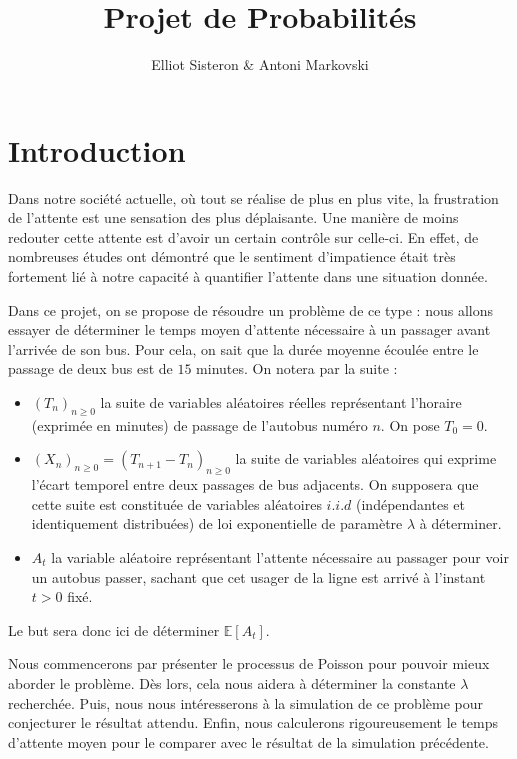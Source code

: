 \documentclass[a4paper, titlepage]{livret} %
\title{Projet de Probabilités} %
\author{Elliot Sisteron & Antoni Markovski} %
\begin{document}

	
	\chapter*{Introduction}
		Dans notre société actuelle, où tout se réalise de plus en plus vite, la frustration de l'attente est une sensation des plus déplaisante. 
		Une manière de moins redouter cette attente est d'avoir un certain contrôle sur celle-ci. 
		En effet, de nombreuses études ont démontré que le sentiment d'impatience était très fortement lié à notre capacité à quantifier l'attente dans une situation donnée.
		
		Dans ce projet, on se propose de résoudre un problème de ce type : nous allons essayer de déterminer le temps moyen d'attente nécessaire à un passager avant l'arrivée de son bus.
		Pour cela, on sait que la durée moyenne écoulée entre le passage de deux bus est de $15$ minutes.
		On notera par la suite : 
		\begin{itemize}
			\item $(T_{n})_{n \geq 0}$ la suite de variables aléatoires réelles représentant l'horaire (exprimée en minutes) de passage de l'autobus numéro $n$. On pose $T_{0} = 0$.
			\item $(X_{n})_{n \geq 0} = (T_{n+1} - T_{n})_{n \geq 0}$ la suite de variables aléatoires qui exprime l'écart temporel entre deux passages de bus adjacents. On supposera que cette suite est constituée de variables aléatoires $i.i.d$ (indépendantes et identiquement distribuées) de loi exponentielle de paramètre $\lambda$ à déterminer.
			\item $A_{t}$ la variable aléatoire représentant l'attente nécessaire au passager pour voir un autobus passer, sachant que cet usager de la ligne est arrivé à l'instant $t > 0$ fixé. 
		\end{itemize}
		Le but sera donc ici de déterminer $\mathbb{E}[A_{t}]$.
	
		Nous commencerons par présenter le processus de Poisson pour pouvoir mieux aborder le problème.
		Dès lors, cela nous aidera à déterminer la constante $\lambda$ recherchée.
		Puis, nous nous intéresserons à la simulation de ce problème pour conjecturer le résultat attendu.
		Enfin, nous calculerons rigoureusement le temps d'attente moyen pour le comparer avec le résultat de la simulation précédente.
\end{document}
